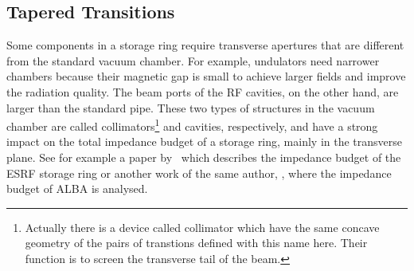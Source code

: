 \subsection{Tapered Transitions}\label{ssec:tapered_transitions}

    Some components in a storage ring require transverse apertures that are different from the standard vacuum chamber. For example, undulators need narrower chambers because their magnetic gap is small to achieve larger fields and improve the radiation quality. The beam ports of the RF cavities, on the other hand, are larger than the standard pipe. These two types of structures in the vacuum chamber are called collimators\footnote{Actually there is a device called collimator which have the same concave geometry of the pairs of transtions defined with this name here. Their function is to screen the transverse tail of the beam.} and cavities, respectively, and have a strong impact on the total impedance budget of a storage ring, mainly in the transverse plane. See for example a paper by~ which describes the impedance budget of the ESRF storage ring or another work of the same author, , where the impedance budget of ALBA is analysed.

